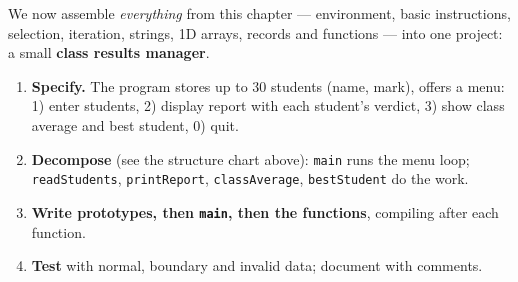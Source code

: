 \documentclass[11pt]{article}
\begin{document}
We now assemble \emph{everything} from this chapter --- environment, basic instructions, selection, iteration, strings, 1D arrays, records and functions --- into one project: a small \textbf{class results manager}.

\begin{methode}
\begin{enumerate}
\item \textbf{Specify.} The program stores up to 30 students (name, mark), offers a menu: 1) enter students, 2) display report with each student's verdict, 3) show class average and best student, 0) quit.
\item \textbf{Decompose} (see the structure chart above): \texttt{main} runs the menu loop; \texttt{readStudents}, \texttt{printReport}, \texttt{classAverage}, \texttt{bestStudent} do the work.
\item \textbf{Write prototypes, then \texttt{main}, then the functions}, compiling after each function.
\item \textbf{Test} with normal, boundary and invalid data; document with comments.
\end{enumerate}
\end{methode}
\end{document}
